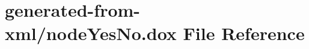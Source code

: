 \hypertarget{nodeYesNo_8dox}{}\section{generated-\/from-\/xml/node\+Yes\+No.dox File Reference}
\label{nodeYesNo_8dox}
